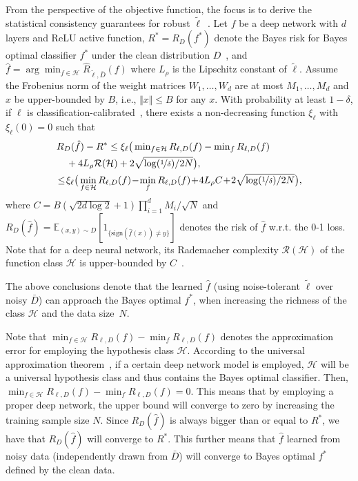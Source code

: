 \label{sec:thm:obj}
From the perspective of the objective function, 
the focus is to derive the statistical consistency 
guarantees for robust 
$\tilde{\ell}$~.
Let $f$ be a deep network with $d$ layers and ReLU active function,
$R^*=R_D(f^*)$ denote the Bayes risk for Bayes optimal classifier $f^*$ under the clean distribution $D$~,
and $\hat{f} = \arg\min_{f\in\mathcal{H}} \widehat{R}_{\tilde{\ell},\bar{D}}(f)$
where $L_{\rho}$ is the Lipschitz constant of $\tilde{\ell}$.
Assume the Frobenius norm of the weight matrices $W_1,\ldots,W_d$ are at most $M_1,\ldots,M_d$
and $x$ be upper-bounded by $B$, i.e., $\Vert x \Vert \leq B$ for any $x$. 
With probability at least $1-\delta$, if $\ell$ is classification-calibrated~, 
there exists a non-decreasing function $\xi_{\ell}$ with $\xi_{\ell}(0)=0$ such that 
\begin{equation*}
\begin{split}
& R_D (\hat{f})  - R^* \leq \xi_{\ell}\big(\min\nolimits_{f\in\mathcal{H}} R_{\ell,D}(f) - \min\nolimits_f R_{\ell,D}(f) 
\\
& \quad + 4L_{\rho}\mathcal{R}(\mathcal{H}) + 2 \sqrt{\log(\nicefrac{1}{\delta}) / 2N}\big), 
\\
& \! \leq \! \xi_{\ell}\big(\min_{f\in\mathcal{H}} R_{\ell,D}(f) 
\! - \! \min_f R_{\ell,D}(f) 
\! + \! 4L_{\rho} C 
\! + \! 2 \sqrt{\log(\nicefrac{1}{\delta})/2N}\big),
\end{split}
\end{equation*}
where 
$C = B(\sqrt{2 d \log 2} \! + \! 1) \prod\nolimits_{i=1}^d M_i/\sqrt{N}$ and
$R_D(\hat{f}) = \mathbb{E}_{(x,y) \sim D}[1_{\{\text{sign}(\hat{f}(x))\neq y\}}]$ 
denotes the risk of $\hat{f}$ w.r.t. the 0-1 loss.
Note that
for a deep neural network, 
its Rademacher complexity $\mathcal{R}(\mathcal{H})$ of the function class $\mathcal{H}$ is upper-bounded by $C$~.
\begin{remark}
The above conclusions denote that the learned $\hat{f}$ (using noise-tolerant $\tilde{\ell}$ over noisy $\bar{D}$) can approach the Bayes optimal $f^*$, when increasing the richness of the class $\mathcal{H}$ and the data size~$N$.
\end{remark}
Note that $\min_{f\in\mathcal{H}} R_{\ell,D}(f) - \min_f R_{\ell,D}(f)$ denotes the approximation error for employing the hypothesis class $\mathcal{H}$.
According to the universal approximation theorem~, 
if a certain deep network model is employed, $\mathcal{H}$ will be a universal hypothesis class and thus contains the Bayes optimal classifier. 
Then, $\min_{f\in\mathcal{H}} R_{\ell,D}(f) - \min_f R_{\ell,D}(f)=0$. 
This means that by employing a proper deep network, 
the upper bound will converge to zero by increasing the training sample size $N$. Since $R_D(\hat{f})$ is always bigger than or equal to $R^*$, 
we have that $R_D(\hat{f})$ will converge to $R^*$. 
This further means that $\hat{f}$ learned from noisy data (independently drawn from $\bar{D}$) will converge to Bayes optimal $f^*$ defined by the clean data.

